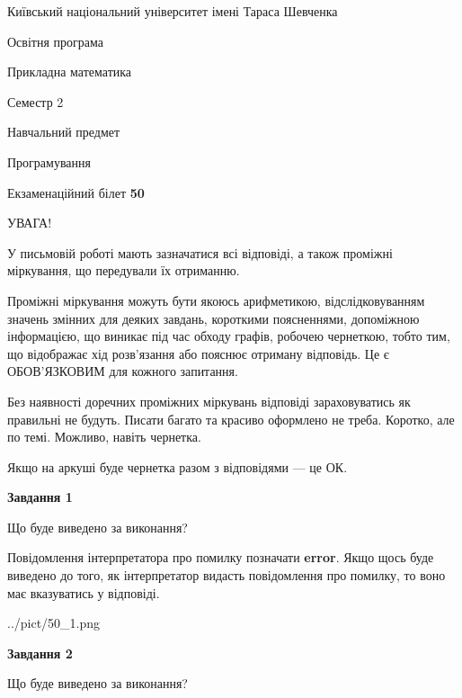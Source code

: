 \documentclass[12pt, ukrainian]{article}
\begin{document}
{{\begin {small}\par
{ \center  Київський національний університет імені Тараса Шевченка \par}
{\parbox {5 cm}{Освітня програма \hfill}{\parbox {7 cm}{Прикладна математика \hfill}}\parbox {6 cm}{\hfill Семестр 2}}\par
{\parbox {5 cm} {Навчальний предмет \hfill}\parbox {7 cm}{Програмування \hfill}\parbox {6cm}{\hfill}\par}\vspace{-7pt} \end{small}}{\center Екзаменаційний білет \No \textbf
{ 50 }\par}}
{
\begin {large}
УВАГА!

У письмовій роботі мають зазначатися всі відповіді, а також проміжні міркування, що передували їх отриманню.

Проміжні міркування можуть бути якоюсь арифметикою, відслідковуванням зна\-чень змінних для деяких завдань,
короткими поясненнями, допоміжною інформацією, що виникає під час обходу графів, робочею чернеткою,
тобто тим, що відображає хід розв’язання або пояснює отриману відповідь.
Це є ОБОВ’ЯЗКОВИМ для кожного запитання.

Без наявності доречних проміжних міркувань відповіді зараховуватись як правиль\-ні не будуть.
Писати багато та красиво оформлено не треба. Коротко, але по темі. Можли\-во, навіть чернетка.

Якщо на аркуші буде чернетка разом з відповідями --- це ОК.

\newpage

{\begin {center}\textbf{Завдання 1}\end {center}}\par
Що буде виведено за виконання?

Повідомлення інтерпретатора про помилку позначати \textbf{error}.
Якщо щось буде виведено до того, як інтерпретатор видасть повідомлення про помилку, 
то воно має вказуватись у відповіді. \par


\begin{center}
	{../pict/50_1.png}
\end{center}
\newpage

{\begin {center}\textbf{Завдання 2}\end {center}}\par
Що буде виведено за виконання?


\end{large}}
\end{document}

